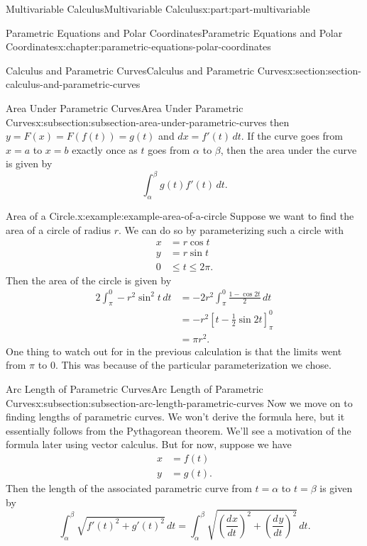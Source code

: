 \documentclass[twoside,10pt,]{book}
\numberwithin{equation}{part}
\newcommand{\dv}[3][]{\dfrac{d^{#1} #2}{d #3^{#1}}}
\newcommand{\amp}{&}
\begin{document}
\begin{partptx}{Multivariable Calculus}{}{Multivariable Calculus}{}{}{x:part:part-multivariable}
\begin{chapterptx}{Parametric Equations and Polar Coordinates}{}{Parametric Equations and Polar Coordinates}{}{}{x:chapter:parametric-equations-polar-coordinates}
\begin{sectionptx}{Calculus and Parametric Curves}{}{Calculus and Parametric Curves}{}{}{x:section:section-calculus-and-parametric-curves}
\begin{subsectionptx}{Area Under Parametric Curves}{}{Area Under Parametric Curves}{}{}{x:subsection:subsection-area-under-parametric-curves}
then \(y = F(x) = F(f(t)) = g(t)\) and \(dx = f'(t)\,dt\). If the curve goes from \(x=a\) to \(x=b\) exactly once as \(t\) goes from \(\alpha\) to \(\beta\), then the area under the curve is given by%
\begin{equation*}
\int_{\alpha}^{\beta}g(t)f'(t)\,dt.
\end{equation*}
%
\begin{example}{Area of a Circle.}{x:example:example-area-of-a-circle}%
Suppose we want to find the area of a circle of radius \(r\). We can do so by parameterizing such a circle with%
%
\begin{align*}
x \amp = r\cos t \\
y \amp = r\sin t \\
0 \amp \leq t\leq 2\pi. 
\end{align*}
Then the area of the circle is given by%
\begin{align*}
2\int_{\pi}^{0} -r^{2}\sin^{2}t\,dt \amp= -2r^{2}\int_{\pi}^{0}\frac{1-\cos2t}{2}\,dt\\
\amp = -r^{2}\left[t-\frac{1}{2}\sin2t\right]_{\pi}^{0} \\
\amp = \pi r^{2}.
\end{align*}
One thing to watch out for in the previous calculation is that the limits went from \(\pi\) to \(0\). This was because of the particular parameterization we chose.%
\end{example}
\end{subsectionptx}
%
%
\typeout{************************************************}
\typeout{************************************************}
%
\begin{subsectionptx}{Arc Length of Parametric Curves}{}{Arc Length of Parametric Curves}{}{}{x:subsection:subsection-arc-length-parametric-curves}
Now we move on to finding lengths of parametric curves. We won't derive the formula here, but it essentially follows from the Pythagorean theorem. We'll see a motivation of the formula later using vector calculus. But for now, suppose we have%
%
\begin{align*}
x \amp = f(t) \\
y \amp = g(t). 
\end{align*}
Then the length of the associated parametric curve from \(t=\alpha\) to \(t=\beta\) is given by%
%
\begin{equation*}
\int_{\alpha}^{\beta} \sqrt{f'(t)^{2}+g'(t)^{2}}\,dt = \int_{\alpha}^{\beta}\sqrt{\left(\dv{x}{t}\right)^{2} + \left(\dv{y}{t}\right)^{2}}\,dt.

\end{equation*}
\end{subsectionptx}
\end{sectionptx}
\end{chapterptx}
\end{partptx}
\end{document}

